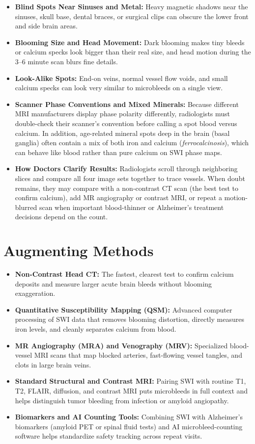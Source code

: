\begin{itemize}
    \item \textbf{Blind Spots Near Sinuses and Metal:} Heavy magnetic shadows near the sinuses, skull base, dental braces, or surgical clips can obscure the lower front and side brain areas.
    \item \textbf{Blooming Size and Head Movement:} Dark blooming makes tiny bleeds or calcium specks look bigger than their real size, and head motion during the 3--6 minute scan blurs fine details.
    \item \textbf{Look-Alike Spots:} End-on veins, normal vessel flow voids, and small calcium specks can look very similar to microbleeds on a single view.
    \item \textbf{Scanner Phase Conventions and Mixed Minerals:} Because different MRI manufacturers display phase polarity differently, radiologists must double-check their scanner's convention before calling a spot blood versus calcium. In addition, age-related mineral spots deep in the brain (basal ganglia) often contain a mix of both iron and calcium (\textit{ferrocalcinosis}), which can behave like blood rather than pure calcium on SWI phase maps.
    \item \textbf{How Doctors Clarify Results:} Radiologists scroll through neighboring slices and compare all four image sets together to trace vessels. When doubt remains, they may compare with a non-contrast CT scan (the best test to confirm calcium), add MR angiography or contrast MRI, or repeat a motion-blurred scan when important blood-thinner or Alzheimer's treatment decisions depend on the count.
\end{itemize}

\section{Augmenting Methods}

\begin{itemize}
    \item \textbf{Non-Contrast Head CT:} The fastest, clearest test to confirm calcium deposits and measure larger acute brain bleeds without blooming exaggeration.
    \item \textbf{Quantitative Susceptibility Mapping (QSM):} Advanced computer processing of SWI data that removes blooming distortion, directly measures iron levels, and cleanly separates calcium from blood.
    \item \textbf{MR Angiography (MRA) and Venography (MRV):} Specialized blood-vessel MRI scans that map blocked arteries, fast-flowing vessel tangles, and clots in large brain veins.
    \item \textbf{Standard Structural and Contrast MRI:} Pairing SWI with routine T1, T2, FLAIR, diffusion, and contrast MRI puts microbleeds in full context and helps distinguish tumor bleeding from infection or amyloid angiopathy.
    \item \textbf{Biomarkers and AI Counting Tools:} Combining SWI with Alzheimer's biomarkers (amyloid PET or spinal fluid tests) and AI microbleed-counting software helps standardize safety tracking across repeat visits.
\end{itemize}

